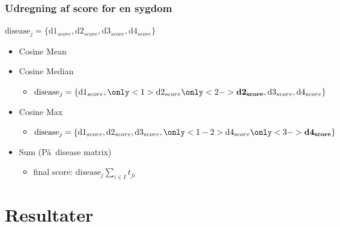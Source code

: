\documentclass[xcolor=table]{beamer}
\begin{document}
\begin{frame}

  \frametitle{Udregning af score for en sygdom}
  
  $ \textrm{disease}_j = \{\textrm{d1}_{score}, \textrm{d2}_{score}, \textrm{d3}_{score}, \textrm{d4}_{score} \} $

  \begin{itemize}
    \item Cosine Mean
      \begin{itemize}
      \end{itemize}
    \item Cosine Median
      \begin{itemize}
        \item $ \textrm{disease}_j = \{\textrm{d1}_{score}, \only<1>{\textrm{d2}_{score}} \only<2->{\textbf{d2}_{\mathbf{score}}}, \textrm{d3}_{score}, \textrm{d4}_{score} \} $
      \end{itemize}
    \item Cosine Max
      \begin{itemize}
        \item $ \textrm{disease}_j = \{\textrm{d1}_{score}, \textrm{d2}_{score}, \textrm{d3}_{score}, \only<1-2>{\textrm{d4}_{score}} \only<3->{\textbf{d4}_{\mathbf{score}}} \} $
      \end{itemize}
    \item Sum (P\aa\ disease matrix)
      \begin{itemize}
        \item final score: $\textrm{disease}_j \sum_{i \in I} t_{ji} $
      \end{itemize}
  \end{itemize}

\end{frame}

\section{Resultater}

\subsection*{}
\end{document}
